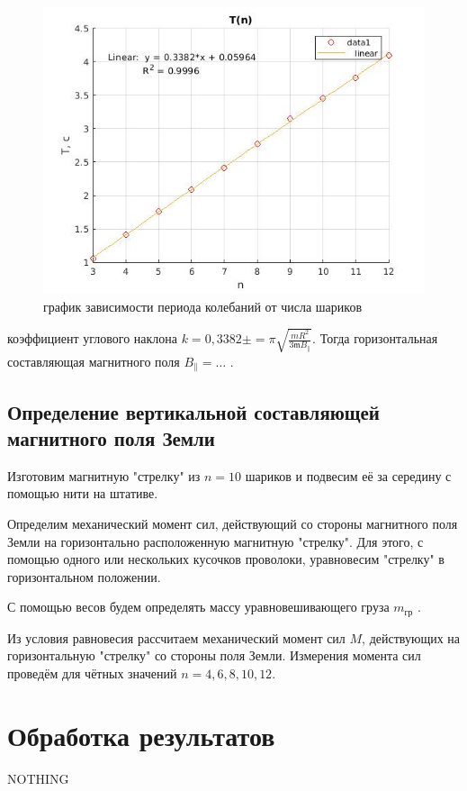 \documentclass[a4paper, 12pt]{article}%
\begin{document}
\begin{figure}[h]
    \centering
    \includegraphics[width = 9 cm]{graph1_s.jpg}
    \caption{график зависимости периода колебаний от числа шариков}
    \label{msh1}
\end{figure}

коэффициент углового наклона $k = 0,3382 \pm = \pi \sqrt{\frac{m R^{2}}{3 \mathfrak{m} B_{\|}}}$. Тогда горизонтальная составляющая магнитного поля $B_{\|} = \dots $ .

\subsection{Определение вертикальной составляющей магнитного поля Земли}

Изготовим магнитную "стрелку" из $n = 10$ шариков и подвесим её за середину с помощью нити на штативе. 

Определим механический момент сил, действующий со стороны магнитного поля Земли на горизонтально расположенную магнитную "стрелку". Для этого, с помощью одного или нескольких кусоч­ков проволоки, уравновесим "стрелку" в горизонтальном положении.

С помощью весов будем определять массу уравновешивающего груза $m_{\text{гр}}$ .

Из условия равновесия рассчитаем механический момент сил $M$, действующих на горизонтальную "стрелку" со стороны поля Земли. Измерения момента сил проведём для чётных значений $n = 4, 6, 8, 10, 12$. 






\section{Обработка результатов}

NOTHING
\end{document}
